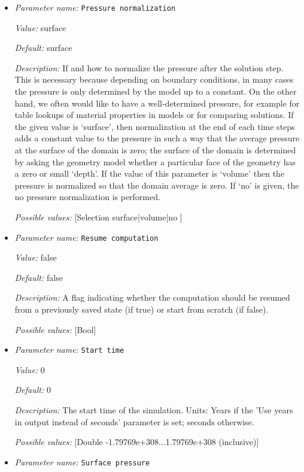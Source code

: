 \begin{itemize}
{\it Possible values:} [DirectoryName]
\item {\it Parameter name:} {\tt Pressure normalization}
\label{parameters:Pressure normalization}


{\it Value:} surface


{\it Default:} surface


{\it Description:} If and how to normalize the pressure after the solution step. This is necessary because depending on boundary conditions, in many cases the pressure is only determined by the model up to a constant. On the other hand, we often would like to have a well-determined pressure, for example for table lookups of material properties in models or for comparing solutions. If the given value is `surface', then normalization at the end of each time steps adds a constant value to the pressure in such a way that the average pressure at the surface of the domain is zero; the surface of the domain is determined by asking the geometry model whether a particular face of the geometry has a zero or small `depth'. If the value of this parameter is `volume' then the pressure is normalized so that the domain average is zero. If `no' is given, the no pressure normalization is performed.


{\it Possible values:} [Selection surface|volume|no ]
\item {\it Parameter name:} {\tt Resume computation}
\label{parameters:Resume computation}


{\it Value:} false


{\it Default:} false


{\it Description:} A flag indicating whether the computation should be resumed from a previously saved state (if true) or start from scratch (if false).


{\it Possible values:} [Bool]
\item {\it Parameter name:} {\tt Start time}
\label{parameters:Start time}


{\it Value:} 0


{\it Default:} 0


{\it Description:} The start time of the simulation. Units: Years if the 'Use years in output instead of seconds' parameter is set; seconds otherwise.


{\it Possible values:} [Double -1.79769e+308...1.79769e+308 (inclusive)]
\item {\it Parameter name:} {\tt Surface pressure}
\label{parameters:Surface pressure}



\end{itemize}
